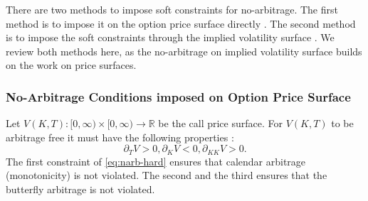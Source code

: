 \documentclass{article}
\theoremstyle{plain}%
\newtheorem{lemma}[theorem]{Lemma}
\theoremstyle{definition}
\theoremstyle{remark}
\begin{document}
There are two methods to impose soft constraints for no-arbitrage. The first method is to impose it on the option price surface directly \citep{itkin-2019}. The second method is to impose the soft constraints through the implied volatility surface \citep{ackerer-2020}.  We review both methods here, as the no-arbitrage on implied volatility surface builds on the work on price surfaces.

\subsubsection{No-Arbitrage Conditions imposed on Option Price Surface}
Let $V(K,T):[0,\infty)\times[0,\infty)\rightarrow\mathbb{R}$ be the call price surface. For $V(K,T)$ to be arbitrage free it must have the following properties \citep{carr-2005}:
\begin{equation}
    \partial_T V > 0,\partial_K V < 0, \partial_{KK}V > 0.
    \label{eq:narb-hard}
\end{equation}
The first constraint of \eqref{eq:narb-hard} ensures that calendar arbitrage (monotonicity) is not violated. The second and the third ensures that the butterfly arbitrage is not violated.
\end{document}
